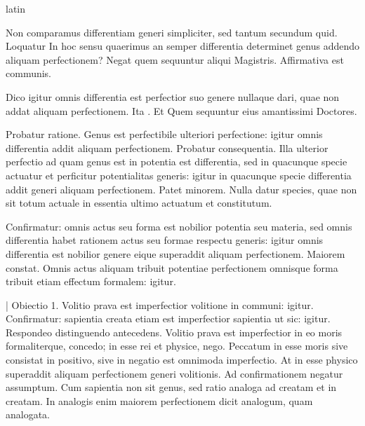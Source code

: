\begin{otherlanguage*}{latin}
\pstart
{}
\pend

\pstart
Non comparamus differentiam generi simpliciter, sed tantum secundum quid. Loquatur  In hoc sensu quaerimus an semper differentia determinet genus addendo aliquam perfectionem? Negat  quem sequuntur aliqui Magistris. Affirmativa est communis. 
\pend

\pstart
Dico igitur omnis differentia est perfectior suo genere nullaque dari, quae non addat aliquam perfectionem. Ita . Et  Quem sequuntur eius amantissimi Doctores. 
\pend

\pstart
Probatur ratione. Genus est perfectibile ulteriori perfectione:
igitur omnis differentia addit aliquam perfectionem. Probatur consequentia. Illa ulterior perfectio ad quam genus est in potentia est differentia, sed in quacunque specie actuatur et perficitur potentialitas generis:
igitur in quacunque specie differentia addit generi aliquam perfectionem. Patet minorem. Nulla datur species, quae non sit totum actuale in essentia ultimo actuatum et constitutum. 
\pend

\pstart
Confirmatur:
omnis actus seu forma est nobilior potentia seu materia, sed omnis differentia habet rationem actus seu formae respectu generis:
igitur omnis differentia est nobilior genere eique superaddit aliquam perfectionem. Maiorem constat. Omnis actus aliquam tribuit potentiae perfectionem omnisque forma tribuit etiam effectum formalem:
igitur. 
\pend

\pstart
\textnormal{|} Obiectio 1. Volitio prava est imperfectior volitione in communi:
igitur. Confirmatur:
sapientia creata etiam est imperfectior sapientia ut sic:
igitur. Respondeo distinguendo antecedens. Volitio prava est imperfectior in eo moris formaliterque, concedo; in esse rei et physice, nego. Peccatum in esse moris sive consistat in positivo, sive in negatio est omnimoda imperfectio. At in esse physico superaddit aliquam perfectionem generi volitionis. Ad confirmationem negatur assumptum. Cum sapientia non sit genus, sed ratio analoga ad creatam et in creatam. In analogis enim maiorem perfectionem dicit analogum, quam analogata. 
\pend


\end{otherlanguage*}

